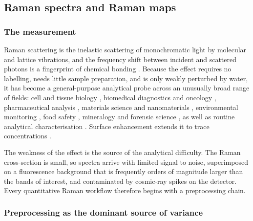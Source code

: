 
\subsection{Raman spectra and Raman maps}
\label{sec:background}

\subsubsection{The measurement}

Raman scattering is the inelastic scattering of monochromatic light by
molecular and lattice vibrations, and the frequency shift between incident and
scattered photons is a fingerprint of chemical bonding
\cite{colthup2012introduction,mccreery2005raman}. Because the effect requires
no labelling, needs little sample preparation, and is only weakly perturbed by
water, it has become a general-purpose analytical probe across an unusually
broad range of fields: cell and tissue biology
\cite{shipp2017advances,butler2016using,smith2016raman,movasaghi2007raman},
biomedical diagnostics and oncology
\cite{fernandez2023adv,auner2018raman,mahadevan1996raman,kong2015raman,talari2019advancing,heng2021advances},
pharmaceutical analysis
\cite{vankeirsbilck2002applications,wang2018raman}, materials science and
nanomaterials \cite{weber2013raman,kumar2012raman}, environmental monitoring
\cite{halvorson2010surface,ong2020using}, food safety \cite{pang2016raman},
mineralogy \cite{carey2015machine,lafuente2015power} and forensic science
\cite{chalmers2012infrared}, as well as routine analytical characterisation
\cite{pedersen2023raman}. Surface enhancement extends it to trace
concentrations \cite{ciallamay2017recent,fornasaro2020surface}.

The weakness of the effect is the source of the analytical difficulty. The
Raman cross-section is small, so spectra arrive with limited signal to noise,
superimposed on a fluorescence background that is frequently orders of
magnitude larger than the bands of interest, and contaminated by cosmic-ray
spikes on the detector. Every quantitative Raman workflow therefore begins with
a preprocessing chain.

\subsubsection{Preprocessing as the dominant source of variance}
\label{sec:prep-variance}

